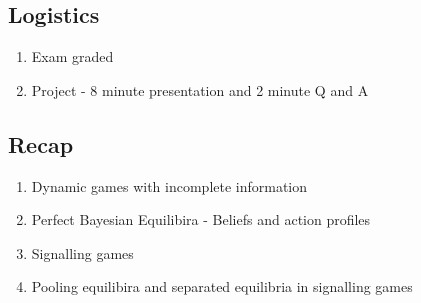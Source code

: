 \newsection
\subsection*{Logistics}
\begin{enumerate}
    \item Exam graded
    \item Project - 8 minute presentation and 2 minute Q and A
\end{enumerate}
\subsection*{Recap}
\begin{enumerate}
    \item Dynamic games with incomplete information
    \item Perfect Bayesian Equilibira - Beliefs and action profiles
    \item Signalling games
    \item Pooling equilibira and separated equilibria in signalling games
\end{enumerate}

